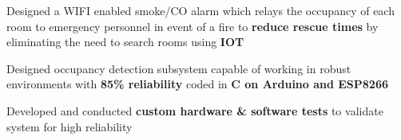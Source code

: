 \documentclass[letterpaper]{deedy-resume}
\begin{document}
\begin{center}
\begin{minipage}[t]{0.66\textwidth}



\vspace{\topsep}
\begin{tightitemize}

\item Designed a WIFI enabled smoke/CO alarm which relays the occupancy of each room to emergency personnel in event of a fire to \textbf{reduce rescue times} by eliminating the need to search rooms using \textbf{IOT}
\vspace{1mm}
\item Designed occupancy detection subsystem capable of working in robust environments with \textbf{85\% reliability} coded in \textbf{C on Arduino and ESP8266}
\vspace{1mm}
\item Developed and conducted \textbf{custom hardware \& software tests} to validate system for high reliability
\end{tightitemize}
\sectionspace




\end{minipage}
\end{center}
\end{document}
